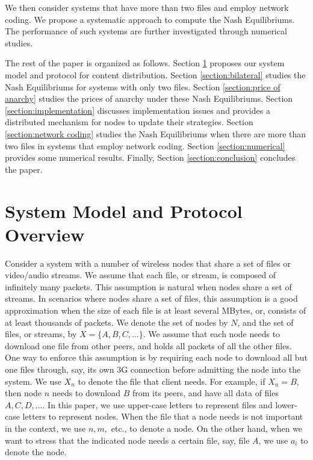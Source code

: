 \documentclass[11pt, conference]{IEEEtran}
\begin{document}
We then consider systems that have more than two files and employ network coding. We propose a systematic approach to compute the Nash Equilibriums. The performance of such systems are further investigated through numerical studies.

The rest of the paper is organized as follows. Section \ref{section:protocol} proposes our system model and protocol for content distribution. Section \ref{section:bilateral} studies the Nash Equilibriums for systems with only two files. Section \ref{section:price of anarchy} studies the prices of anarchy under these Nash Equilibriums. Section \ref{section:implementation} discusses implementation issues and provides a distributed mechanism for nodes to update their strategies. Section \ref{section:network coding} studies the Nash Equilibriums when there are more than two files in systems that employ network coding. Section \ref{section:numerical} provides some numerical results. Finally, Section \ref{section:conclusion} concludes the paper.







\section{System Model and Protocol Overview}
\label{section:protocol}

Consider a system with a number of wireless nodes that share a set of files or video/audio streams. We assume that each file, or stream, is composed of infinitely many packets. This assumption is natural when nodes share a set of streams. In scenarios where nodes share a set of files, this assumption is a good approximation when the size of each file is at least several MBytes, or, consists of at least thousands of packets. We denote the set of nodes by $N$, and the set of files, or streams, by $X=\{A,B,C,\dots\}$. We assume that each node needs to download one file from other peers, and holds all packets of all the other files. One way to enforce this assumption is by requiring each node to download all but one files through, say, its own 3G connection before admitting the node into the system. We use $X_n$ to denote the file that client needs. For example, if $X_n=B$, then node $n$ needs to download $B$ from its peers, and have all data of files $A,C,D,\dots.$ In this paper, we use upper-case letters to represent files and lower-case letters to represent nodes. When the file that a node needs is not important in the context, we use $n,m,$ etc., to denote a node. On the other hand, when we want to stress that the indicated node needs a certain file, say, file $A$, we use $a_i$ to denote the node.
\end{document}
